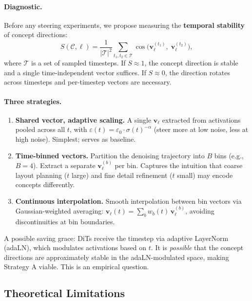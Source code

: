 \documentclass[11pt]{article}
\begin{document}
\paragraph{Diagnostic.}
Before any steering experiments, we propose measuring the \textbf{temporal stability} of concept directions:
\begin{equation}
    S(\mathcal{C}, \ell) = \frac{1}{|\mathcal{T}|^2} \sum_{t_1, t_2 \in \mathcal{T}} \cos\bigl(\mathbf{v}_\ell^{(t_1)},\; \mathbf{v}_\ell^{(t_2)}\bigr),
    \label{eq:stability}
\end{equation}
where $\mathcal{T}$ is a set of sampled timesteps.
If $S \approx 1$, the concept direction is stable and a single time-independent vector suffices.
If $S \approx 0$, the direction rotates across timesteps and per-timestep vectors are necessary.

\paragraph{Three strategies.}
\begin{enumerate}
    \item[\textbf{A.}] \textbf{Shared vector, adaptive scaling.} A single $\mathbf{v}_\ell$ extracted from activations pooled across all $t$, with $\varepsilon(t) = \varepsilon_0 \cdot \sigma(t)^{-\alpha}$ (steer more at low noise, less at high noise). Simplest; serves as baseline.
    \item[\textbf{B.}] \textbf{Time-binned vectors.} Partition the denoising trajectory into $B$ bins (e.g., $B = 4$). Extract a separate $\mathbf{v}_\ell^{(b)}$ per bin. Captures the intuition that coarse layout planning ($t$ large) and fine detail refinement ($t$ small) may encode concepts differently.
    \item[\textbf{C.}] \textbf{Continuous interpolation.} Smooth interpolation between bin vectors via Gaussian-weighted averaging: $\mathbf{v}_\ell(t) = \sum_b w_b(t)\, \mathbf{v}_\ell^{(b)}$, avoiding discontinuities at bin boundaries.
\end{enumerate}
A possible saving grace: DiTs receive the timestep via adaptive LayerNorm (adaLN), which modulates activations based on $t$.
It is \emph{possible} that the concept directions are approximately stable in the adaLN-modulated space, making Strategy A viable.
This is an empirical question.

\subsection{Theoretical Limitations}
\end{document}
